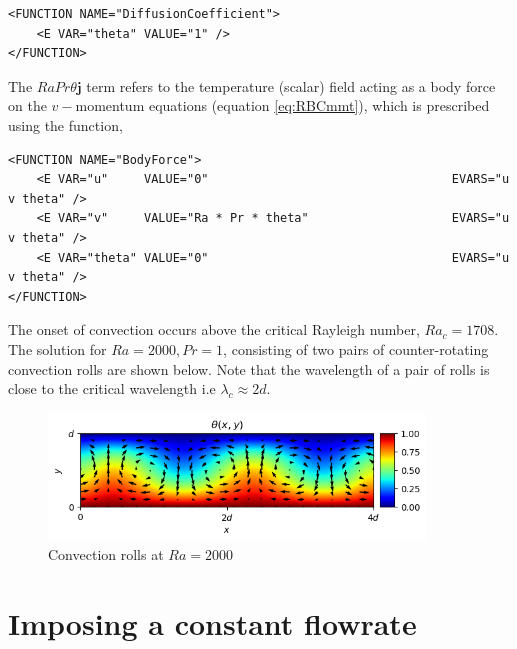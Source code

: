 \begin{lstlisting}[style=XMLStyle]
<FUNCTION NAME="DiffusionCoefficient">
    <E VAR="theta" VALUE="1" />
</FUNCTION>
\end{lstlisting}

The $RaPr\theta \mathbf{j}$ term refers to the temperature (scalar) field acting as a body force on the $v-$momentum equations (equation \ref{eq:RBCmmt}), which is prescribed using the  function,
\begin{lstlisting}[style=XMLStyle]
<FUNCTION NAME="BodyForce">                                                        
    <E VAR="u"     VALUE="0"                                  EVARS="u v theta" />
    <E VAR="v"     VALUE="Ra * Pr * theta"                    EVARS="u v theta" />
    <E VAR="theta" VALUE="0"                                  EVARS="u v theta" /> 
</FUNCTION>                                                                        
\end{lstlisting}

The onset of convection occurs above the critical Rayleigh number, $Ra_{c} = 1708$.
The solution for $Ra = 2000, Pr = 1$, consisting of two pairs of counter-rotating convection rolls are shown below.
Note that the wavelength of a pair of rolls is close to the critical wavelength i.e $\lambda_c \approx 2d$.
\begin{figure}
\begin{center}
\includegraphics[width=10cm]{img/Ra2000Rolls.png}
\caption{Convection rolls at $Ra = 2000$}
\label{f:incns:RBC}
\end{center}
\end{figure}


\section{Imposing a constant flowrate}

